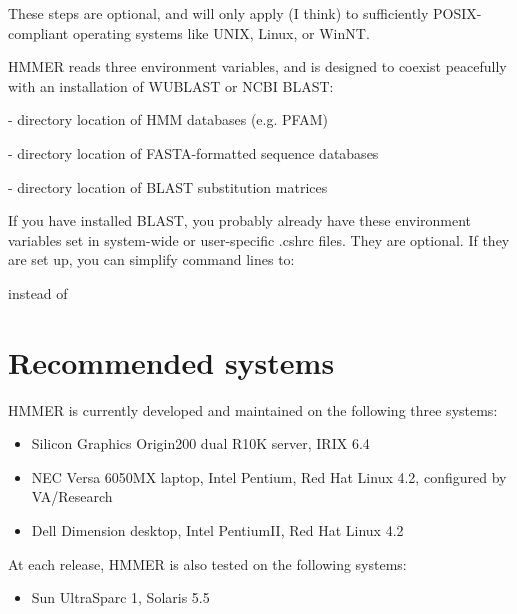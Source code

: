 These steps are optional, and will only apply (I think) to
sufficiently POSIX-compliant operating systems like UNIX, Linux, or
WinNT.

HMMER reads three environment variables, and is designed to coexist
peacefully with an installation of WUBLAST or NCBI BLAST:

\begin{wideitem}
\item[\emprog{HMMERDB}] - directory location of HMM databases (e.g. PFAM)
\item[\emprog{BLASTDB}] - directory location of FASTA-formatted sequence databases
\item[\emprog{BLASTMAT}] - directory location of BLAST substitution matrices
\end{wideitem}

If you have installed BLAST, you probably already have these 
environment variables set in system-wide or user-specific
.cshrc files. They are optional. If they are set up, you
can simplify command lines to:

\vspace{1.5em}

instead of

\vspace{1.5em}

\section{Recommended systems}

HMMER is currently developed and maintained on the following three
systems:

\begin{itemize}
\item Silicon Graphics Origin200 dual R10K server, IRIX 6.4
\item NEC Versa 6050MX laptop, Intel Pentium, 
      Red Hat Linux 4.2, configured by VA/Research
\item Dell Dimension desktop, Intel PentiumII, Red Hat
      Linux 4.2
\end{itemize}

At each release, HMMER is also tested on the following systems:

\begin{itemize}
\item Sun UltraSparc 1, Solaris 5.5
\end{itemize}


